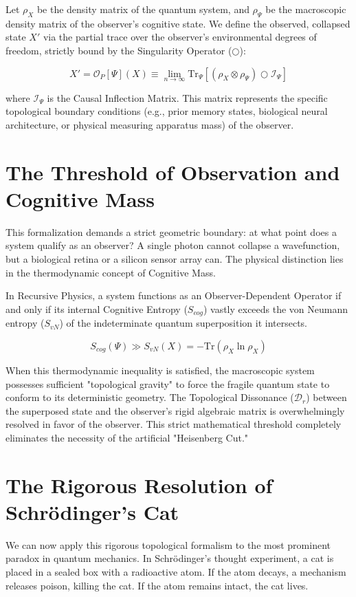 \documentclass[12pt,openany]{book}
\begin{document}
Let $\rho_X$ be the density matrix of the quantum system, and $\rho_\Psi$ be the macroscopic density matrix of the observer's cognitive state. We define the observed, collapsed state $X'$ via the partial trace over the observer's environmental degrees of freedom, strictly bound by the Singularity Operator ($\bigcirc$):

\begin{equation}
X' = \mathcal{O}_P[\Psi](X) \equiv \lim_{n \to \infty} \text{Tr}_\Psi \left[ (\rho_X \otimes \rho_\Psi) \bigcirc \mathcal{I}_\Psi \right]
\end{equation}

where $\mathcal{I}_\Psi$ is the Causal Inflection Matrix. This matrix represents the specific topological boundary conditions (e.g., prior memory states, biological neural architecture, or physical measuring apparatus mass) of the observer.

\section{The Threshold of Observation and Cognitive Mass}
This formalization demands a strict geometric boundary: at what point does a system qualify as an observer? A single photon cannot collapse a wavefunction, but a biological retina or a silicon sensor array can. The physical distinction lies in the thermodynamic concept of Cognitive Mass.

In Recursive Physics, a system functions as an Observer-Dependent Operator if and only if its internal Cognitive Entropy ($S_{cog}$) vastly exceeds the von Neumann entropy ($S_{vN}$) of the indeterminate quantum superposition it intersects.

\begin{equation}
S_{cog}(\Psi) \gg S_{vN}(X) = -\text{Tr}(\rho_X \ln \rho_X)
\end{equation}

When this thermodynamic inequality is satisfied, the macroscopic system possesses sufficient "topological gravity" to force the fragile quantum state to conform to its deterministic geometry. The Topological Dissonance ($\mathcal{D}_r$) between the superposed state and the observer's rigid algebraic matrix is overwhelmingly resolved in favor of the observer. This strict mathematical threshold completely eliminates the necessity of the artificial "Heisenberg Cut."

\section{The Rigorous Resolution of Schr\"{o}dinger's Cat}
We can now apply this rigorous topological formalism to the most prominent paradox in quantum mechanics. In Schr\"{o}dinger's thought experiment, a cat is placed in a sealed box with a radioactive atom. If the atom decays, a mechanism releases poison, killing the cat. If the atom remains intact, the cat lives.
\end{document}
